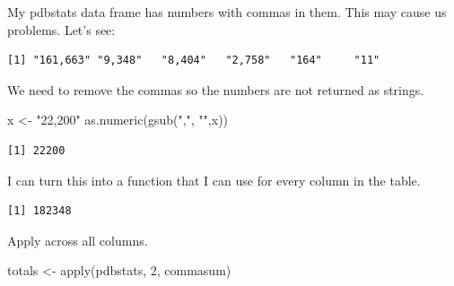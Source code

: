 \documentclass[
  letterpaper,
  DIV=11,
  numbers=noendperiod]{scrartcl}
\newenvironment{Shaded}{\begin{snugshade}}{\end{snugshade}}
\newcommand{\ControlFlowTok}[1]{\textcolor[rgb]{0.00,0.23,0.31}{#1}}
\newcommand{\DecValTok}[1]{\textcolor[rgb]{0.68,0.00,0.00}{#1}}
\newcommand{\FunctionTok}[1]{\textcolor[rgb]{0.28,0.35,0.67}{#1}}
\newcommand{\NormalTok}[1]{\textcolor[rgb]{0.00,0.23,0.31}{#1}}
\newcommand{\OtherTok}[1]{\textcolor[rgb]{0.00,0.23,0.31}{#1}}
\newcommand{\SpecialCharTok}[1]{\textcolor[rgb]{0.37,0.37,0.37}{#1}}
\newcommand{\StringTok}[1]{\textcolor[rgb]{0.13,0.47,0.30}{#1}}
\begin{document}
My pdbstats data frame has numbers with commas in them. This may cause
us problems. Let's see:

\begin{Shaded}
\end{Shaded}

\begin{verbatim}
[1] "161,663" "9,348"   "8,404"   "2,758"   "164"     "11"     
\end{verbatim}

We need to remove the commas so the numbers are not returned as strings.

\begin{Shaded}
\begin{Highlighting}[]
\NormalTok{x }\OtherTok{\textless{}{-}} \StringTok{"22,200"}
\FunctionTok{as.numeric}\NormalTok{(}\FunctionTok{gsub}\NormalTok{(}\StringTok{","}\NormalTok{, }\StringTok{""}\NormalTok{,x))}
\end{Highlighting}
\end{Shaded}

\begin{verbatim}
[1] 22200
\end{verbatim}

I can turn this into a function that I can use for every column in the
table.

\begin{Shaded}
\end{Shaded}

\begin{verbatim}
[1] 182348
\end{verbatim}

Apply across all columns.

\begin{Shaded}
\begin{Highlighting}[]
\NormalTok{totals }\OtherTok{\textless{}{-}} \FunctionTok{apply}\NormalTok{(pdbstats, }\DecValTok{2}\NormalTok{, commasum)}
\end{Highlighting}
\end{Shaded}
\end{document}
